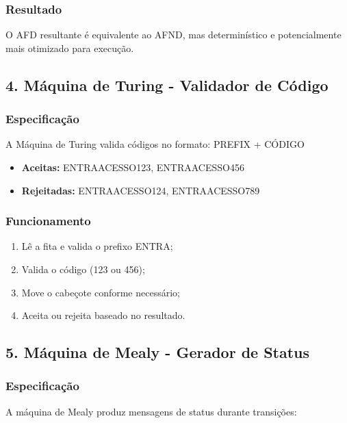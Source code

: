 \documentclass[12pt,a4paper]{article}
\begin{document}
\subsubsection{Resultado}

O AFD resultante é equivalente ao AFND, mas determinístico e potencialmente mais otimizado para execução.

\subsection{4. Máquina de Turing - Validador de Código}

\subsubsection{Especificação}

A Máquina de Turing valida códigos no formato: PREFIX + CÓDIGO

\begin{itemize}
    \item \textbf{Aceitas:} ENTRAACESSO123, ENTRAACESSO456
    \item \textbf{Rejeitadas:} ENTRAACESSO124, ENTRAACESSO789
\end{itemize}

\subsubsection{Funcionamento}

\begin{enumerate}
    \item Lê a fita e valida o prefixo ENTRA;
    \item Valida o código (123 ou 456);
    \item Move o cabeçote conforme necessário;
    \item Aceita ou rejeita baseado no resultado.
\end{enumerate}

\subsection{5. Máquina de Mealy - Gerador de Status}

\subsubsection{Especificação}

A máquina de Mealy produz mensagens de status durante transições:
\end{document}
